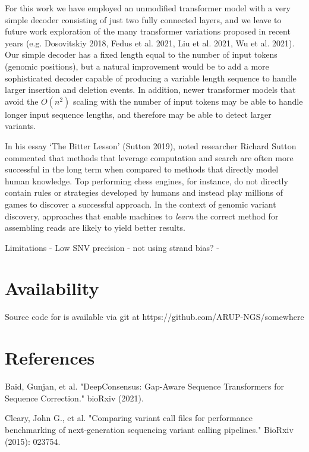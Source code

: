 \documentclass[]{article}
\begin{document}
For this work we have employed an unmodified transformer model with a very simple decoder consisting of just two fully connected layers, and we leave to future work exploration of the many transformer variations proposed in recent years (e.g. Dosovitskiy 2018, Fedus et al. 2021, Liu et al. 2021, Wu et al. 2021). Our simple decoder has a fixed length equal to the number of input tokens (genomic positions), but a natural improvement would be to add a more sophisticated decoder capable of producing a variable length sequence to handle larger insertion and deletion events.  In addition, newer transformer models that avoid the $O(n^2)$ scaling with the number of input tokens may be able to handle longer input sequence lengths, and therefore may be able to detect larger variants. 

In his essay `The Bitter Lesson' (Sutton 2019), noted researcher Richard Sutton commented that methods that leverage computation and search are often more successful in the long term when compared to methods that directly model human knowledge. Top performing chess engines, for instance, do not directly contain rules or strategies developed by humans and instead play millions of games to discover a successful approach. In the context of genomic variant discovery, approaches that enable machines to \textit{learn} the correct method for assembling reads are likely to yield better results.  


Limitations
 - Low SNV precision
 - not using strand bias?
 - 

\section{Availability}
 
 Source code for is available via git at https://github.com/ARUP-NGS/somewhere
 
\section{References}

\vspace{8pt}
Baid, Gunjan, et al. "DeepConsensus: Gap-Aware Sequence Transformers for Sequence Correction." bioRxiv (2021).

\vspace{8pt}
Cleary, John G., et al. "Comparing variant call files for performance benchmarking of next-generation sequencing variant calling pipelines." BioRxiv (2015): 023754.
\end{document}
